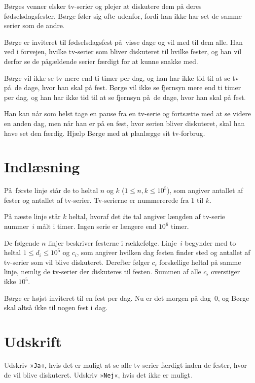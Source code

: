 Børges venner elsker tv-serier og plejer at diskutere dem på deres fødselsdagsfester.
Børge føler sig ofte udenfor, fordi han ikke har set de samme serier som de andre.

Børge er inviteret til fødselsdagsfest på visse dage og vil med til dem alle.
Han ved i forvejen, hvilke tv-serier som bliver diskuteret til hvilke fester, og han vil derfor se de pågældende serier færdigt for at kunne snakke med.

Børge vil ikke se tv mere end ti timer per dag, og han har ikke tid til at se tv på de dage, hvor han skal på fest.
Børge vil ikke se fjernsyn mere end ti timer per dag, og han har ikke tid til at se fjernsyn på de dage, hvor han skal på fest.

Han kan når som helst tage en pause fra en tv-serie og fortsætte med at se videre en anden dag, men når han er på en fest, hvor serien bliver diskuteret, skal han have set den færdig.
Hjælp Børge med at planlægge sit tv-forbrug.

\section*{Indlæsning}
På første linje står de to heltal $n$ og $k$ ($1 \leq n,k \leq 10^5$), som angiver antallet af fester og antallet af tv-serier.
Tv-serierne er nummererede fra $1$ til $k$.

På næste linje står $k$ heltal, hvoraf det $i$te tal angiver længden af tv-serie nummer~$i$ målt i timer.
Ingen serie er længere end $10^6$ timer.

De følgende $n$ linjer beskriver festerne i rækkefølge.
Linje~$i$ begynder med to heltal $1 \leq d_i \leq 10^5$ og $c_i$, som angiver hvilken dag festen finder sted og antallet af tv-serier som vil blive diskuteret.
Derefter følger $c_i$ forskellige heltal på samme linje, nemlig de tv-serier der diskuteres til festen.
Summen af alle $c_i$ overstiger ikke $10^5$.

Børge er højst inviteret til en fest per dag. 
Nu er det morgen på dag~$0$, og Børge skal altså ikke til nogen fest i dag.

\section*{Udskrift}
Udskriv »\texttt{Ja}«, hvis det er muligt at se alle tv-serier færdigt inden de fester, hvor de vil blive diskuteret.
Udskriv »\texttt{Nej}«, hvis det ikke er muligt.

